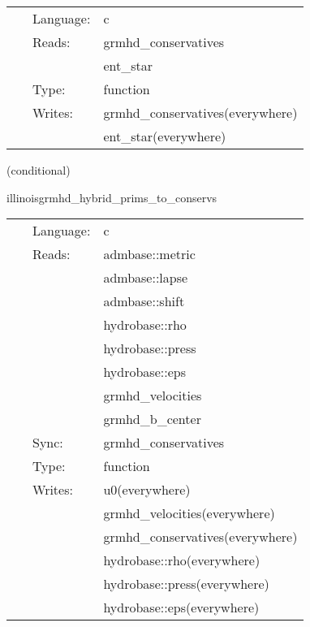 \documentclass{article}
\begin{document}
\hspace{5mm}

 \begin{tabular*}{160mm}{cll} 
~ & Language:  & c \\ 
~ & Reads:  & grmhd\_conservatives \\ 
~& ~ &ent\_star\\ 
~ & Type:  & function \\ 
~ & Writes:  & grmhd\_conservatives(everywhere) \\ 
~& ~ &ent\_star(everywhere)\\ 
\end{tabular*} 


\vspace{5mm}

   (conditional) 

\hspace{5mm} illinoisgrmhd\_hybrid\_prims\_to\_conservs 

\hspace{5mm}{\it hybrid version of illinoisgrmhd\_prims\_to\_conservs } 


\hspace{5mm}

 \begin{tabular*}{160mm}{cll} 
~ & Language:  & c \\ 
~ & Reads:  & admbase::metric \\ 
~& ~ &admbase::lapse\\ 
~& ~ &admbase::shift\\ 
~& ~ &hydrobase::rho\\ 
~& ~ &hydrobase::press\\ 
~& ~ &hydrobase::eps\\ 
~& ~ &grmhd\_velocities\\ 
~& ~ &grmhd\_b\_center\\ 
~ & Sync:  & grmhd\_conservatives \\ 
~ & Type:  & function \\ 
~ & Writes:  & u0(everywhere) \\ 
~& ~ &grmhd\_velocities(everywhere)\\ 
~& ~ &grmhd\_conservatives(everywhere)\\ 
~& ~ &hydrobase::rho(everywhere)\\ 
~& ~ &hydrobase::press(everywhere)\\ 
~& ~ &hydrobase::eps(everywhere)\\ 
\end{tabular*} 
\end{document}
